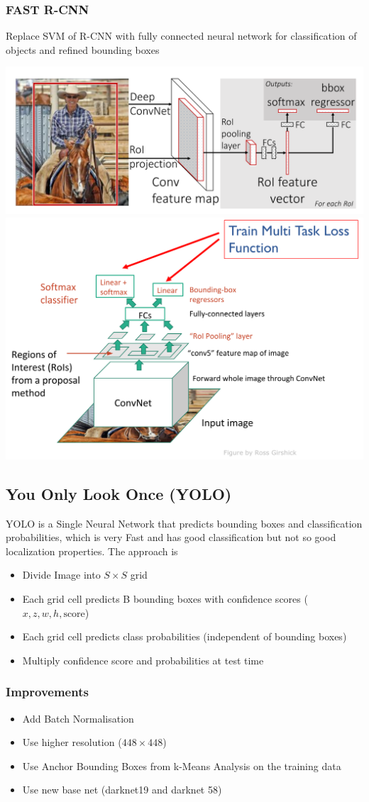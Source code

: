 \documentclass[11pt]{article}
\theoremstyle{definition}
\begin{document}
\subsubsection{FAST R-CNN}
Replace SVM of R-CNN with fully connected neural network for classification of objects and refined bounding boxes
\begin{center}
	\includegraphics[width=0.7\linewidth]{img/fast_r-cnn_structure}
	\includegraphics[width=0.7\linewidth]{img/fast_r-cnn_structure2}
\end{center}

\subsection{You Only Look Once (YOLO)}
YOLO is a Single Neural Network that predicts bounding boxes and classification probabilities, which is very Fast and has good classification but not so good localization properties. The approach is
\begin{itemize}[label=-,nosep]
	\item Divide Image into $S \times S$ grid
	\item Each grid cell predicts B bounding boxes with confidence scores ($x, z, w, h, \text{score}$)
	\item Each grid cell predicts class probabilities (independent of bounding boxes)
	\item Multiply confidence score and probabilities at test time
\end{itemize}

\subsubsection{Improvements}
\begin{itemize}[label=-]
	\item Add Batch Normalisation
	\item Use higher resolution ($448\times 448$)
	\item Use Anchor Bounding Boxes from k-Means Analysis on the training data
	\item Use new base net (darknet19 and darknet 58)
\end{itemize}
\end{document}
